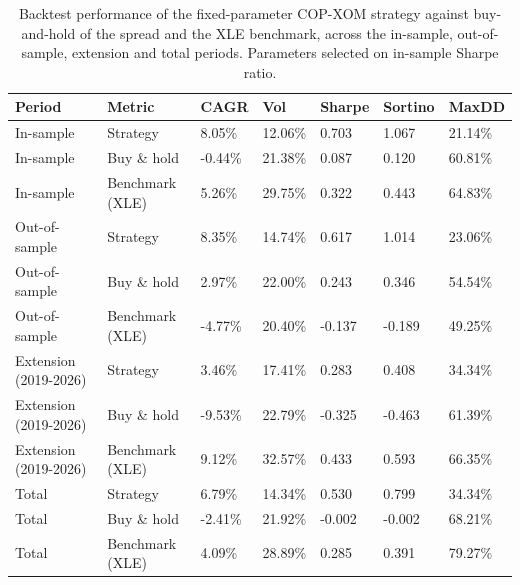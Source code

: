 \begin{table}[H]
\centering
\caption{Backtest performance of the fixed-parameter COP-XOM strategy against buy-and-hold of the spread and the XLE benchmark, across the in-sample, out-of-sample, extension and total periods. Parameters selected on in-sample Sharpe ratio.} 
\label{tab:backtest_perf}
\begin{tabular}{lllllll}
  \toprule
Period & Metric & CAGR & Vol & Sharpe & Sortino & MaxDD \\ 
  \midrule
In-sample & Strategy & 8.05\% & 12.06\% & 0.703 & 1.067 & 21.14\% \\ 
  In-sample & Buy \& hold & -0.44\% & 21.38\% & 0.087 & 0.120 & 60.81\% \\ 
  In-sample & Benchmark (XLE) & 5.26\% & 29.75\% & 0.322 & 0.443 & 64.83\% \\ 
  Out-of-sample & Strategy & 8.35\% & 14.74\% & 0.617 & 1.014 & 23.06\% \\ 
  Out-of-sample & Buy \& hold & 2.97\% & 22.00\% & 0.243 & 0.346 & 54.54\% \\ 
  Out-of-sample & Benchmark (XLE) & -4.77\% & 20.40\% & -0.137 & -0.189 & 49.25\% \\ 
  Extension (2019-2026) & Strategy & 3.46\% & 17.41\% & 0.283 & 0.408 & 34.34\% \\ 
  Extension (2019-2026) & Buy \& hold & -9.53\% & 22.79\% & -0.325 & -0.463 & 61.39\% \\ 
  Extension (2019-2026) & Benchmark (XLE) & 9.12\% & 32.57\% & 0.433 & 0.593 & 66.35\% \\ 
  Total & Strategy & 6.79\% & 14.34\% & 0.530 & 0.799 & 34.34\% \\ 
  Total & Buy \& hold & -2.41\% & 21.92\% & -0.002 & -0.002 & 68.21\% \\ 
  Total & Benchmark (XLE) & 4.09\% & 28.89\% & 0.285 & 0.391 & 79.27\% \\ 
   \bottomrule
\end{tabular}
\end{table}
